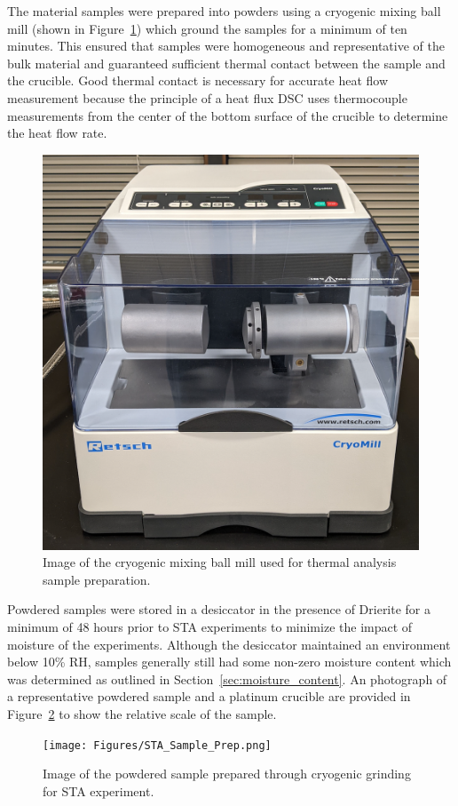 \documentclass[12pt,oneside]{book}
\begin{document}
The material samples were prepared into powders using a cryogenic mixing ball mill (shown in Figure~\ref{fig:cryomill}) which ground the samples for a minimum of ten minutes. This ensured that samples were homogeneous and representative of the bulk material and guaranteed sufficient thermal contact between the sample and the crucible. Good thermal contact is necessary for accurate heat flow measurement because the principle of a heat flux DSC uses thermocouple measurements from the center of the bottom surface of the crucible to determine the heat flow rate.

\begin{figure}[!ht]
\centering
\includegraphics[width=.75\columnwidth]{Figures/Cryomill.png}
\caption[Image of the Cryogenic Mixing Ball Mill Used for Thermal Analysis Sample Preparation]{Image of the cryogenic mixing ball mill used for thermal analysis sample preparation.}
\label{fig:cryomill}
\end{figure}

Powdered samples were stored in a desiccator in the presence of Drierite for a minimum of 48 hours prior to STA experiments to minimize the impact of moisture of the experiments. Although the desiccator maintained an environment below 10\% RH, samples generally still had some non-zero moisture content which was determined as outlined in Section~\ref{sec:moisture_content}. An photograph of a representative powdered sample and a platinum crucible are provided in Figure~\ref{fig:sta_sample} to show the relative scale of the sample.

\begin{figure}[!ht]
\centering
\texttt{[image: Figures/STA\_Sample\_Prep.png]}
\caption[Image of the Powdered Sample Prepared through Cryogenic Grinding for STA Experiment]{Image of the powdered sample prepared through cryogenic grinding for STA experiment.}
\label{fig:sta_sample}
\end{figure}
\end{document}
